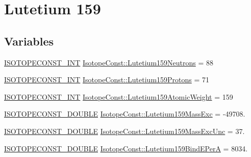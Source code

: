 \hypertarget{group___isotope_const-_lutetium-_lu159}{}\section{Lutetium 159}
\label{group___isotope_const-_lutetium-_lu159}
\subsection*{Variables}
\begin{DoxyCompactItemize}
\item 
\mbox{\hyperlink{group___isotope_const-_macros_ga5f18360b3e99483a35c32d789e62621c}{I\+S\+O\+T\+O\+P\+E\+C\+O\+N\+S\+T\+\_\+\+I\+NT}} \mbox{\hyperlink{group___isotope_const-_lutetium-_lu159_ga0fcabf930a6543eb909289beb3bccf69}{Isotope\+Const\+::\+Lutetium159\+Neutrons}} = 88
\item 
\mbox{\hyperlink{group___isotope_const-_macros_ga5f18360b3e99483a35c32d789e62621c}{I\+S\+O\+T\+O\+P\+E\+C\+O\+N\+S\+T\+\_\+\+I\+NT}} \mbox{\hyperlink{group___isotope_const-_lutetium-_lu159_ga22a23e0ba306af9402b0ea2756f7444b}{Isotope\+Const\+::\+Lutetium159\+Protons}} = 71
\item 
\mbox{\hyperlink{group___isotope_const-_macros_ga5f18360b3e99483a35c32d789e62621c}{I\+S\+O\+T\+O\+P\+E\+C\+O\+N\+S\+T\+\_\+\+I\+NT}} \mbox{\hyperlink{group___isotope_const-_lutetium-_lu159_ga8d12e6675b0f123ddb6c61da18f70a5b}{Isotope\+Const\+::\+Lutetium159\+Atomic\+Weight}} = 159
\item 
\mbox{\hyperlink{group___isotope_const-_macros_ga8f45a7272ce02c0b4c65c44636ed719a}{I\+S\+O\+T\+O\+P\+E\+C\+O\+N\+S\+T\+\_\+\+D\+O\+U\+B\+LE}} \mbox{\hyperlink{group___isotope_const-_lutetium-_lu159_ga9607486e5b320b0e4d376101fba529c9}{Isotope\+Const\+::\+Lutetium159\+Mass\+Exc}} = -\/49708.
\item 
\mbox{\hyperlink{group___isotope_const-_macros_ga8f45a7272ce02c0b4c65c44636ed719a}{I\+S\+O\+T\+O\+P\+E\+C\+O\+N\+S\+T\+\_\+\+D\+O\+U\+B\+LE}} \mbox{\hyperlink{group___isotope_const-_lutetium-_lu159_gae447c2a336edae23793a2fdf74bbc256}{Isotope\+Const\+::\+Lutetium159\+Mass\+Exc\+Unc}} = 37.
\item 
\mbox{\hyperlink{group___isotope_const-_macros_ga8f45a7272ce02c0b4c65c44636ed719a}{I\+S\+O\+T\+O\+P\+E\+C\+O\+N\+S\+T\+\_\+\+D\+O\+U\+B\+LE}} \mbox{\hyperlink{group___isotope_const-_lutetium-_lu159_gaeacc9211854e1bac5e91a66c6049e053}{Isotope\+Const\+::\+Lutetium159\+Bind\+E\+PerA}} = 8034.
\item 

\end{DoxyCompactItemize}
